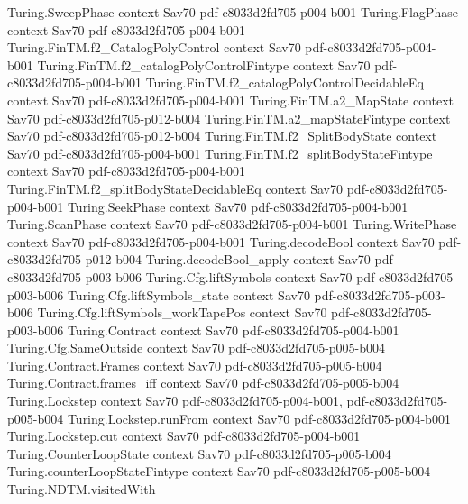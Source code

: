 \begin{theorem}
\proofstep
  {Turing.SweepPhase}
  {context}
  {Sav70}
  {pdf-c8033d2fd705-p004-b001}
\proofstep
  {Turing.FlagPhase}
  {context}
  {Sav70}
  {pdf-c8033d2fd705-p004-b001}
\proofstep
  {Turing.FinTM.f2_CatalogPolyControl}
  {context}
  {Sav70}
  {pdf-c8033d2fd705-p004-b001}
\proofstep
  {Turing.FinTM.f2_catalogPolyControlFintype}
  {context}
  {Sav70}
  {pdf-c8033d2fd705-p004-b001}
\proofstep
  {Turing.FinTM.f2_catalogPolyControlDecidableEq}
  {context}
  {Sav70}
  {pdf-c8033d2fd705-p004-b001}
\proofstep
  {Turing.FinTM.a2_MapState}
  {context}
  {Sav70}
  {pdf-c8033d2fd705-p012-b004}
\proofstep
  {Turing.FinTM.a2_mapStateFintype}
  {context}
  {Sav70}
  {pdf-c8033d2fd705-p012-b004}
\proofstep
  {Turing.FinTM.f2_SplitBodyState}
  {context}
  {Sav70}
  {pdf-c8033d2fd705-p004-b001}
\proofstep
  {Turing.FinTM.f2_splitBodyStateFintype}
  {context}
  {Sav70}
  {pdf-c8033d2fd705-p004-b001}
\proofstep
  {Turing.FinTM.f2_splitBodyStateDecidableEq}
  {context}
  {Sav70}
  {pdf-c8033d2fd705-p004-b001}
\proofstep
  {Turing.SeekPhase}
  {context}
  {Sav70}
  {pdf-c8033d2fd705-p004-b001}
\proofstep
  {Turing.ScanPhase}
  {context}
  {Sav70}
  {pdf-c8033d2fd705-p004-b001}
\proofstep
  {Turing.WritePhase}
  {context}
  {Sav70}
  {pdf-c8033d2fd705-p004-b001}
\proofstep
  {Turing.decodeBool}
  {context}
  {Sav70}
  {pdf-c8033d2fd705-p012-b004}
\proofstep
  {Turing.decodeBool_apply}
  {context}
  {Sav70}
  {pdf-c8033d2fd705-p003-b006}
\proofstep
  {Turing.Cfg.liftSymbols}
  {context}
  {Sav70}
  {pdf-c8033d2fd705-p003-b006}
\proofstep
  {Turing.Cfg.liftSymbols_state}
  {context}
  {Sav70}
  {pdf-c8033d2fd705-p003-b006}
\proofstep
  {Turing.Cfg.liftSymbols_workTapePos}
  {context}
  {Sav70}
  {pdf-c8033d2fd705-p003-b006}
\proofstep
  {Turing.Contract}
  {context}
  {Sav70}
  {pdf-c8033d2fd705-p004-b001}
\proofstep
  {Turing.Cfg.SameOutside}
  {context}
  {Sav70}
  {pdf-c8033d2fd705-p005-b004}
\proofstep
  {Turing.Contract.Frames}
  {context}
  {Sav70}
  {pdf-c8033d2fd705-p005-b004}
\proofstep
  {Turing.Contract.frames_iff}
  {context}
  {Sav70}
  {pdf-c8033d2fd705-p005-b004}
\proofstep
  {Turing.Lockstep}
  {context}
  {Sav70}
  {pdf-c8033d2fd705-p004-b001,
    pdf-c8033d2fd705-p005-b004}
\proofstep
  {Turing.Lockstep.runFrom}
  {context}
  {Sav70}
  {pdf-c8033d2fd705-p004-b001}
\proofstep
  {Turing.Lockstep.cut}
  {context}
  {Sav70}
  {pdf-c8033d2fd705-p004-b001}
\proofstep
  {Turing.CounterLoopState}
  {context}
  {Sav70}
  {pdf-c8033d2fd705-p005-b004}
\proofstep
  {Turing.counterLoopStateFintype}
  {context}
  {Sav70}
  {pdf-c8033d2fd705-p005-b004}
\proofstep
  {Turing.NDTM.visitedWith}

\end{theorem}
